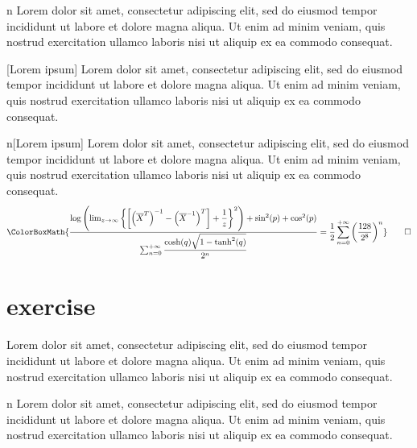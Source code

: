 \begin{intuitively}{n}
	Lorem dolor sit amet, consectetur adipiscing elit, sed do eiusmod tempor incididunt ut labore et dolore magna aliqua. Ut enim ad minim veniam, quis nostrud exercitation ullamco laboris nisi ut aliquip ex ea commodo consequat.
\end{intuitively}

\begin{intuitively}{}[Lorem ipsum]
	Lorem dolor sit amet, consectetur adipiscing elit, sed do eiusmod tempor incididunt ut labore et dolore magna aliqua. Ut enim ad minim veniam, quis nostrud exercitation ullamco laboris nisi ut aliquip ex ea commodo consequat.
\end{intuitively}

\begin{intuitively}{n}[Lorem ipsum]
	Lorem dolor sit amet, consectetur adipiscing elit, sed do eiusmod tempor incididunt ut labore et dolore magna aliqua. Ut enim ad minim veniam, quis nostrud exercitation ullamco laboris nisi ut aliquip ex ea commodo consequat.
	\begin{equation*}
		\ColorBoxMath{\dfrac{\log\left(\lim_{z\to\infty}\left\{\left[\left(\overline{X}^{T}\right)^{-1}-\left(\overline{X}^{-1}\right)^T\right]+\dfrac{1}{z}\right\}^2\right)+\sin^2(p)+\cos^2(p)}{\sum_{n=0}^{+\infty}\dfrac{\cosh(q)\sqrt{1-\tanh^2(q)}}{2^n}}=\dfrac{1}{2}\sum_{n=0}^{+\infty}\left(\dfrac{128}{2^8}\right)^n}\qedhere
	\end{equation*}
\end{intuitively}

\newpage

\section{exercise}

\begin{exercise}{}
	Lorem dolor sit amet, consectetur adipiscing elit, sed do eiusmod tempor incididunt ut labore et dolore magna aliqua. Ut enim ad minim veniam, quis nostrud exercitation ullamco laboris nisi ut aliquip ex ea commodo consequat.
\end{exercise}

\begin{exercise}{n}
	Lorem dolor sit amet, consectetur adipiscing elit, sed do eiusmod tempor incididunt ut labore et dolore magna aliqua. Ut enim ad minim veniam, quis nostrud exercitation ullamco laboris nisi ut aliquip ex ea commodo consequat.
\end{exercise}

